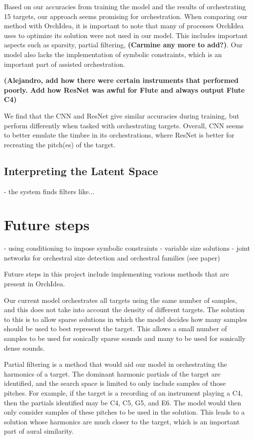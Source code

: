 \documentclass{article}
\begin{document}
Based on our accuracies from training the model and the results of orchestrating 15 targets, our approach seems promising for orchestration. When comparing our method with OrchIdea, it is important to note that many of processes OrchIdea uses to optimize its solution were not used in our model. This includes important aspects such as sparsity, partial filtering, \textbf{(Carmine any more to add?)}. Our model also lacks the implementation of symbolic constraints, which is an important part of assisted orchestration.



\textbf{(Alejandro, add how there were certain instruments that performed poorly. Add how ResNet was awful for Flute and always output Flute C4)}

We find that the CNN and ResNet give similar accuracies during training, but perform differently when tasked with orchestrating targets. Overall, CNN seems to better emulate the timbre in its orchestrations, where ResNet is better for recreating the pitch(es) of the target. 

\subsection{Interpreting the Latent Space}
- the system finds filters like...

\section{Future steps}
- using conditioning to impose symbolic constraints
- variable size solutions
- joint networks for orchestral size detection and orchestral families (see paper)

Future steps in this project include implementing various methods that are present in OrchIdea. 

Our current model orchestrates all targets using the same number of samples, and this does not take into account the density of different targets. The solution to this is to allow sparse solutions in which the model decides how many samples should be used to best represent the target. This allows a small number of samples to be used for sonically sparse sounds and many to be used for sonically dense sounds. 

Partial filtering is a method that would aid our model in orchestrating the harmonics of a target. The dominant harmonic partials of the target are identified, and the search space is limited to only include samples of those pitches. For example, if the target is a recording of an instrument playing a C4, then the partials identified may be C4, C5, G5, and E6. The model would then only consider samples of these pitches to be used in the solution. This leads to a solution whose harmonics are much closer to the target, which is an important part of aural similarity.
\end{document}
